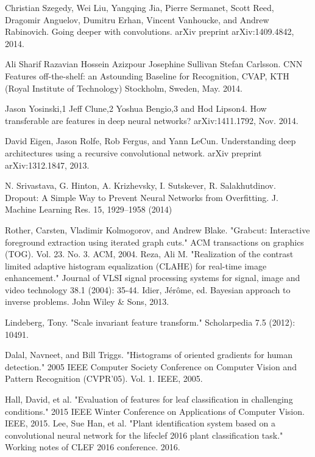 \documentclass[journal, 10pt]{IEEEtran}
\begin{document}
\begin{thebibliography}{1}
    Christian Szegedy, Wei Liu, Yangqing Jia, Pierre Sermanet, Scott Reed, Dragomir Anguelov, Dumitru Erhan, Vincent Vanhoucke, and Andrew Rabinovich. Going deeper with convolutions. arXiv preprint arXiv:1409.4842, 2014.

    Ali Sharif Razavian Hossein Azizpour Josephine Sullivan Stefan Carlsson. CNN Features off-the-shelf: an Astounding Baseline for Recognition, CVAP, KTH (Royal Institute of Technology) Stockholm, Sweden, May. 2014.

    Jason Yosinski,1 Jeff Clune,2 Yoshua Bengio,3 and Hod Lipson4. How transferable are features in deep neural networks? arXiv:1411.1792, Nov. 2014.

    David Eigen, Jason Rolfe, Rob Fergus, and Yann LeCun. Understanding deep architectures using a recursive convolutional network. arXiv preprint arXiv:1312.1847, 2013.

    N. Srivastava, G. Hinton, A. Krizhevsky, I. Sutskever, R. Salakhutdinov. Dropout: A Simple Way to Prevent Neural Networks from Overfitting. J. Machine Learning Res. 15, 1929–1958 (2014)

    Rother, Carsten, Vladimir Kolmogorov, and Andrew Blake. "Grabcut: Interactive foreground extraction using iterated graph cuts." ACM transactions on graphics (TOG). Vol. 23. No. 3. ACM, 2004.
    Reza, Ali M. "Realization of the contrast limited adaptive histogram equalization (CLAHE) for real-time image enhancement." Journal of VLSI signal processing systems for signal, image and video technology 38.1 (2004): 35-44.
    Idier, Jérôme, ed. Bayesian approach to inverse problems. John Wiley \& Sons, 2013.

    Lindeberg, Tony. "Scale invariant feature transform." Scholarpedia 7.5 (2012): 10491.

    Dalal, Navneet, and Bill Triggs. "Histograms of oriented gradients for human detection." 2005 IEEE Computer Society Conference on Computer Vision and Pattern Recognition (CVPR'05). Vol. 1. IEEE, 2005.

    Hall, David, et al. "Evaluation of features for leaf classification in challenging conditions." 2015 IEEE Winter Conference on Applications of Computer Vision. IEEE, 2015.
    Lee, Sue Han, et al. "Plant identification system based on a convolutional neural network for the lifeclef 2016 plant classification task." Working notes of CLEF 2016 conference. 2016.


\end{thebibliography}
\end{document}
